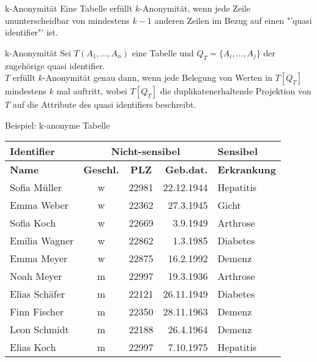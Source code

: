 \begin{frame}{k-Anonymität}
	Eine Tabelle erfüllt \(k\)-Anonymität, wenn jede Zeile ununterscheidbar von mindestens \(k-1\) anderen Zeilen im Bezug auf einen "'quasi identifier"' ist.

	\vspace{0.5cm}

	\begin{block}{k-Anonymität} Sei \(T(A_1, \dots , A_n)\) eine Tabelle und \(Q_T=\{A_i, \dots, A_j\}\) der zugehörige quasi identifier.\\
	\(T\) erfüllt \(k\)-Anonymität genau dann, wenn jede Belegung von Werten in \(T[Q_T]\) mindestens \(k\) mal auftritt, wobei \(T[Q_T]\) die duplikatenerhaltende Projektion von \(T\) auf die Attribute des quasi identifiers beschreibt.
	\end{block}

\end{frame}

\begin{frame}{Beispiel: k-anonyme Tabelle}
	\begin{center}
		\begin{tabular}{|l|c|c|r|l|}
		\hline \textbf{Identifier} & \multicolumn{3}{c|}{\textbf{Nicht-sensibel}} & \textbf{Sensibel} \\ 
		\hline \textbf{Name} & \textbf{Geschl.} & \textbf{PLZ} & \textbf{Geb.dat.} & \textbf{Erkrankung} \\
		\hline \hline Sofia Müller & w & 22981 & 22.12.1944 & Hepatitis \\ 
		\hline Emma Weber & w & 22362 & 27.3.1945 & Gicht \\
		\hline Sofia Koch & w & 22669 & 3.9.1949 & Arthrose \\ 
		\hline Emilia Wagner & w & 22862 & 1.3.1985 & Diabetes \\ 
		\hline Emma Meyer & w & 22875 & 16.2.1992 & Demenz \\  
		\hline Noah Meyer & m & 22997 & 19.3.1936 & Arthrose \\ 
		\hline Elias Schäfer & m & 22121 & 26.11.1949 & Diabetes \\ 
		\hline Finn Fischer & m & 22350 & 28.11.1963 & Demenz \\ 
		\hline Leon Schmidt & m & 22188 & 26.4.1964 & Demenz \\ 
		\hline Elias Koch & m & 22997 & 7.10.1975 & Hepatitis \\ 
		\hline 
		\end{tabular}
	\end{center}
\end{frame}

